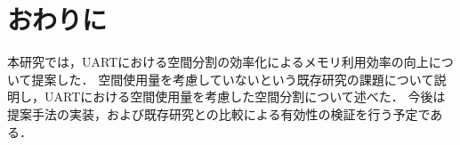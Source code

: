 




\chapter{おわりに}

本研究では，UARTにおける空間分割の効率化によるメモリ利用効率の向上について提案した．
空間使用量を考慮していないという既存研究の課題について説明し，UARTにおける空間使用量を考慮した空間分割について述べた．
今後は提案手法の実装，および既存研究との比較による有効性の検証を行う予定である．
